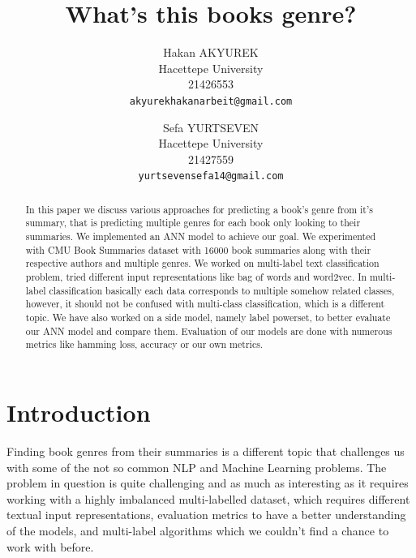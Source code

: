 \documentclass[10pt,twocolumn,letterpaper]{article}
\begin{document}
\title{What's this books genre?}

\author{Hakan AKYUREK\\
Hacettepe University\\
21426553\\
{\tt\small akyurekhakanarbeit@gmail.com}
\and
Sefa YURTSEVEN\\
Hacettepe University\\
21427559\\
{\tt\small yurtsevensefa14@gmail.com}
}

\maketitle

\begin{abstract}
In this paper we discuss various approaches for predicting a book's genre from it's summary, that is predicting multiple genres for each book only looking to their summaries. We implemented an ANN model to achieve our goal. We experimented with CMU Book Summaries dataset with 16000 book summaries along with their respective authors and multiple genres. We worked on multi-label text classification problem, tried different input representations like bag of words and word2vec. In multi-label classification basically each data corresponds to multiple somehow related classes, however, it should not be confused with multi-class classification, which is a different topic. We have also worked on a side model, namely label powerset, to better evaluate our ANN model and compare them. Evaluation of our models are done with numerous metrics like hamming loss, accuracy or our own metrics.
\end{abstract}

\section{Introduction}

Finding book genres from their summaries is a different topic that challenges us with some of the  not so common NLP and Machine Learning problems. The problem in question is quite challenging and as much as interesting as it requires working with a highly imbalanced multi-labelled dataset, which requires different textual input representations, evaluation metrics to have a better understanding of the models, and multi-label algorithms which we couldn't find a chance to work with before.
\end{document}

